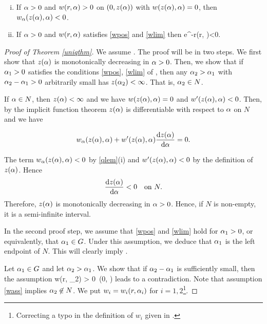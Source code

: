 \begin{lemma}\label{qneglem}
    \begin{enumerate}[(i)]
        \item If $\alpha>0$ and $w(r, \alpha)>0$ on $(0, z(\alpha))$ with $w(z(\alpha), \alpha)=0$, then
            $w_\alpha(z(\alpha),\alpha)<0$.
        \item If $\alpha>0$ and $w(r, \alpha)$ satisfies \eqref{wpos} and \eqref{wlim} then
            \be\label{qexplim}
                 e^{-r}\was(r, \a)<0.
            \ee
    \end{enumerate}
\end{lemma}

\begin{proof}[Proof of Theorem \ref{uniqthm}]
We assume . The proof will be in two steps. We first show that
$z(\alpha)$ is monotonically decreasing in $\alpha>0$. Then, we show that if $\alpha_1>0$
satisfies the conditions \eqref{wpos}, \eqref{wlim} of , then any
$\alpha_2>\alpha_1$ with $\alpha_2-\alpha_1>0$ arbitrarily small has $z(\alpha_2)<\infty$.  That is,
$\alpha_2\in N$.

%
If $\alpha\in N$, then $z(\alpha)<\infty$ and we have $w(z(\alpha),\alpha)=0$ and $w'(z(\alpha),\alpha)<0$.
Then, by the implicit function theorem $z(\alpha)$ is differentiable with respect
to $\alpha$ on $N$ and we have

$$w_\alpha(z(\alpha), \alpha) + w'(z(\alpha), \alpha)\frac{\mathop{}\!\mathrm{d} z(\alpha)}{\mathop{}\!\mathrm{d} \alpha} = 0.$$

The term $w_\alpha(z(\alpha),\alpha)<0$ by \cref{qlem}(i) and $w'(z(\alpha),\alpha)<0$ by the
definition of $z(\alpha)$. Hence 
$$\dfrac{\mathop{}\!\mathrm{d} z(\alpha)}{\mathop{}\!\mathrm{d} \alpha}<0\quad\text{on}~N.$$ 
%
Therefore, $z(\alpha)$ is monotonically decreasing in $\alpha>0$. Hence, if $N$ is
non-empty, it is a semi-infinite interval.
   
In the second proof step, we assume that \eqref{wpos} and \eqref{wlim} hold for
$\alpha_1>0$, or equivalently, that $\alpha_1\in G$. Under this assumption, we deduce
that $\alpha_1$ is the left endpoint of $N$.
This will clearly imply .
   
Let $\alpha_1\in G$ and let $\alpha_2>\alpha_1$. We show that if $\alpha_2-\alpha_1$ is
sufficiently small, then the assumption 
\be\label{wass} w(r, \a_2) > 0\quad{}~(0, \infty)\ee 
leads to a contradiction. Note that assumption \eqref{wass} implies  
$\alpha_2\not\in N$. %
We put $w_i=w_i(r, \alpha_i)$ for $i=1, 2$\footnote{Correcting a typo in
the definition of $w_i$ given in \cite{coffm}.}. 


\end{proof}
